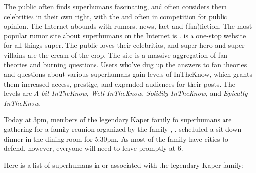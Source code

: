 \documentclass[blue]{LRSguildcamp1}
\begin{document}
The public often finds superhumans fascinating, and often considers them celebrities in their own right, with the \cHeroLeague{\intro} and \cVillainCompact{\intro} often in competition for public opinion.  The Internet abounds with rumors, news, fact and (fan)fiction.  The most popular rumor site about superhumans on the Internet is \pTweenwebsite{}. \pTweenwebsite{} is a one-stop website for all things super. The public loves their celebrities, and super hero and super villains are the cream of the crop. The site is a massive aggregation of fan theories and burning questions.  Users who've dug up the answers to fan theories and questions about various superhumans gain levels of InTheKnow, which grants them increased access, prestige, and expanded audiences for their posts. The levels are \textit{A bit InTheKnow}, \textit{Well InTheKnow}, \textit{Solidily InTheKnow}, and \textit{Epically InTheKnow}.

Today at 3pm, members of the legendary Kaper family fo superhumans are gathering for a family reunion organized by the family \cGrandma{\familyleader}, \cGrandma{\intro}.  \cGrandma{\Theyhave} scheduled a sit-down dinner in the dining room for 5:30pm.  As most of the family have cities to defend, however, everyone will need to leave promptly at 6.

Here is a list of superhumans in or associated with the legendary Kaper family:
\end{document}
